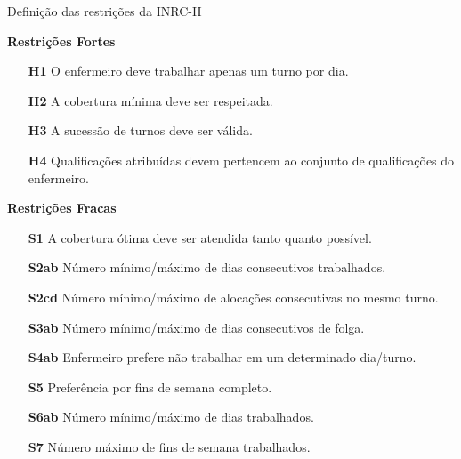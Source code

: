 \documentclass[8pt,mathserif,professionalfont]{beamer}
\begin{document}
\begin{frame}{Definição das restrições da INRC-II}
\smallskip

\textbf{Restrições Fortes}
\begin{itemize}
\item[\textbf{H1}] O enfermeiro deve trabalhar apenas um turno por dia.
\item[\textbf{H2}] A cobertura mínima deve ser respeitada.
\item[\textbf{H3}] A sucessão de turnos deve ser válida.
\item[\textbf{H4}] Qualificações atribuídas devem pertencem ao conjunto de qualificações do enfermeiro.
\end{itemize}
\medskip
\textbf{Restrições Fracas}
\begin{itemize}
\item[\textbf{S1}] A cobertura ótima deve ser atendida tanto quanto possível.
\item[\textbf{S2ab}] Número mínimo/máximo de dias consecutivos trabalhados.
\item[\textbf{S2cd}] Número mínimo/máximo de alocações consecutivas no mesmo turno.
\item[\textbf{S3ab}] Número mínimo/máximo de dias consecutivos de folga.
\item[\textbf{S4ab}] Enfermeiro prefere não trabalhar em um determinado dia/turno.
\item[\textbf{S5}] Preferência por fins de semana completo.
\item[\textbf{S6ab}] Número mínimo/máximo de dias trabalhados.
\item[\textbf{S7}] Número máximo de fins de semana trabalhados.

\end{itemize}


\end{frame}
\end{document}
